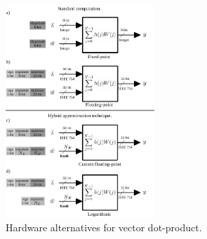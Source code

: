 \begin{figure}[t!]
	\centering
	\includegraphics[width=0.5\textwidth]{../figures/dot-product_unit.pdf}
	\caption{Hardware alternatives for vector dot-product.}
	\label{fig:dot_product}
\end{figure}


